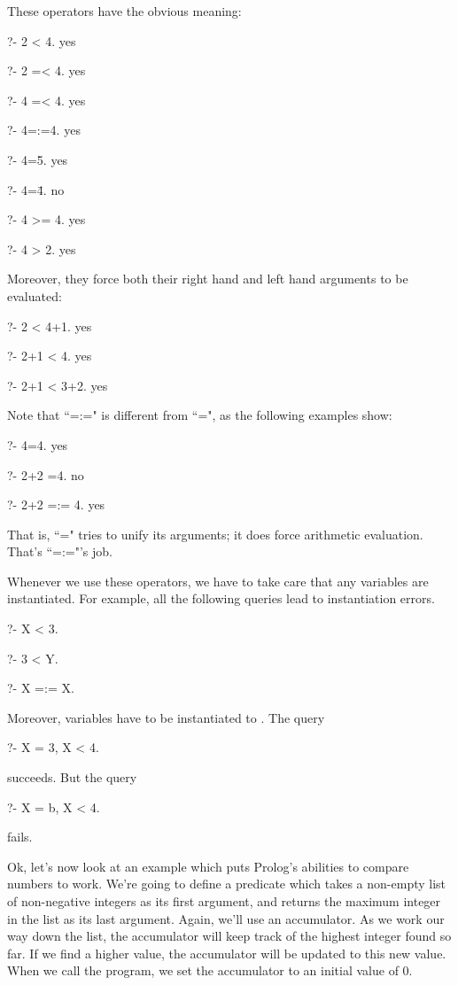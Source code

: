 These operators have the obvious meaning:
\begin{LPNcodedisplay}
?- 2 < 4.
yes

?- 2 =< 4.
yes

?- 4 =< 4.
yes

?- 4=:=4.
yes

?- 4=\=5.
yes

?- 4=\=4.
no

?- 4 >= 4.
yes

?- 4 > 2.
yes
\end{LPNcodedisplay}


Moreover, they force both their right hand and left hand arguments to
be evaluated:
\begin{LPNcodedisplay}
?- 2 < 4+1.
yes

?- 2+1 < 4.
yes

?- 2+1 < 3+2.
yes
\end{LPNcodedisplay}


Note that ``=:=" is different from ``=", as the following examples show:
\begin{LPNcodedisplay}
?- 4=4.
yes

?- 2+2 =4.
no

?- 2+2 =:= 4.
yes
\end{LPNcodedisplay}
That is, ``=" tries to unify its arguments; it does 
force arithmetic evaluation.  That's ``=:="'s job.

Whenever we use these operators, we have to take care that any
variables are instantiated.  For example, all the following queries
lead to instantiation errors.
\begin{LPNcodedisplay}
?- X < 3.

?- 3 < Y.

?- X =:= X.
\end{LPNcodedisplay}
Moreover, variables have to be instantiated to .
The query
\begin{LPNcodedisplay}
?- X = 3, X < 4.
\end{LPNcodedisplay}
succeeds. But the query
\begin{LPNcodedisplay}
?- X = b, X < 4.
\end{LPNcodedisplay}
fails.

Ok, let's now look at an example which puts Prolog's abilities to
compare numbers to work.  We're going to define a predicate which
takes  a non-empty list of non-negative integers as its first
argument, and returns the maximum integer in the list as its last
argument.  Again, we'll use an accumulator.  As we work our way down
the list, the accumulator will keep track of the highest integer found
so far.  If we find a higher value, the accumulator will be updated to
this new value.  When we call the program, we set the accumulator to an
initial value of 0.

